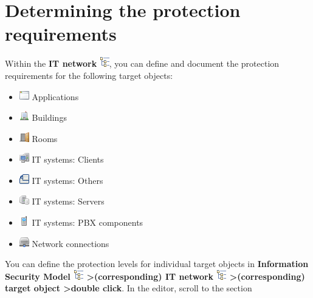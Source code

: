 \documentclass[a4paper,10pt]{book}
\begin{document}
\section{Determining the protection requirements}
Within the \textbf{IT network} \includegraphics[height=2ex]{Icon/GS_Modell.png},
you can define and document the protection requirements for the following target objects:
\begin{itemize}
 \item \includegraphics[height=2ex]{Icon/Anwendung.png} Applications
 \item \includegraphics[height=2ex]{Icon/Gebaeude.png} Buildings
 \item \includegraphics[height=2ex]{Icon/Raeume.png} Rooms
 \item \includegraphics[height=2ex]{Icon/Clients.png} IT systems: Clients
 \item \includegraphics[height=2ex]{Icon/Sonstige.png} IT systems: Others
 \item \includegraphics[height=2ex]{Icon/Server.png} IT systems: Servers
 \item \includegraphics[height=2ex]{Icon/Tk_komponenten.png} IT systems: PBX components
 \item \includegraphics[height=2ex]{Icon/Netzwerkverbindungen.png} Network connections
\end{itemize}
You can define the protection levels for individual target objects in
\textbf{Information Security Model \includegraphics[height=2ex]{Icon/GS_Modell.png}
\textgreater (corresponding) IT network \includegraphics[height=2ex]{Icon/GS_Modell.png}
\textgreater (corresponding) target object \textgreater double click}. In the editor, scroll to the section
\end{document}
